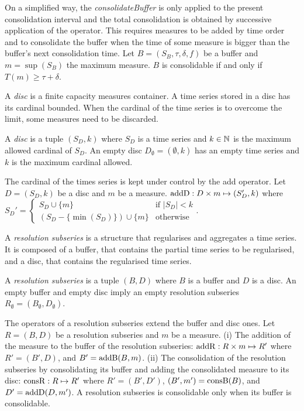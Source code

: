 On a simplified way, the \emph{consolidateBuffer} is only applied to the present
consolidation interval and the total consolidation is obtained by
successive application of the operator. This requires measures to be
added by time order and to consolidate the buffer when the time of
some measure is bigger than the buffer's next consolidation time.  Let
$B=(S_B,\tau,\delta,f)$ be a buffer and $m=\sup(S_B)$ the maximum
measure. $B$ is consolidable if and only if $T(m) \geq
\tau+\delta$.


A \emph{disc} is a finite capacity measures container. A time series
stored in a disc has its cardinal bounded. When the cardinal of the
time series is to overcome the limit, some measures need to be
discarded.
\begin{definition}%
  A \emph{disc} is a tuple $(S_D,k)$ where $S_D$ is a time series and
  $k\in\mathbb{N}$ is the maximum allowed cardinal of $S_D$.  An empty disc
  $D_{\emptyset} = (\emptyset,k)$ has an empty time series and $k$ is
  the maximum cardinal allowed.
\end{definition}

The cardinal of the times series is kept under control by the add
operator. Let $D=(S_D,k)$ be a disc and $m$ be a measure. $\operatorname{addD} : D\times m\mapsto (S'_D,k)$ where %
$
 S_D' = \begin{cases}
  S_D\cup\{m\}                 & \text{if } |S_D|<k  \\
  (S_D-\{\min(S_D)\}) \cup \{m\} & \text{otherwise}
\end{cases}  
$.


A \emph{resolution subseries} is a structure that regularises and
aggregates a time series. It is composed of a buffer, that contains
the partial time series to be regularised, and a disc, that contains
the regularised time series.
\begin{definition}%
  A \emph{resolution subseries} is a tuple $(B,D)$ where $B$ is a
  buffer and $D$ is a disc.  An empty buffer and empty disc imply an
  empty resolution subseries $R_{\emptyset} =
  (B_{\emptyset},D_{\emptyset})$.
\end{definition}
 
The operators of a resolution subseries extend the buffer and disc
ones. Let $R=(B,D)$ be a resolution subseries and $m$ be a measure.
(i) The addition of the measure to the buffer of the resolution
subseries: $\operatorname{addR} : R \times m \mapsto R'$ where $R'= (B',D)$,
and $B'= \operatorname{addB}(B,m)$. (ii) The consolidation of the resolution
subseries by consolidating its buffer and adding the consolidated
measure to its disc: $\operatorname{consR} : R \mapsto R'$ where $R'=
(B',D')$, $(B',m') = \operatorname{consB}(B)$, and $D'= \operatorname{addD}(D,m')$.  A resolution
subseries is consolidable only when its buffer is consolidable.




